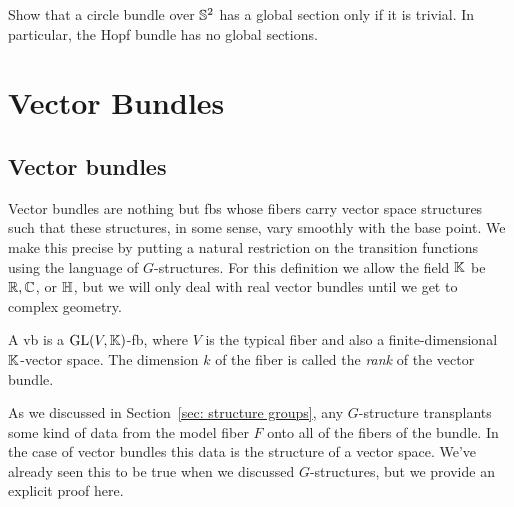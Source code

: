 \begin{xca}
    Show that a circle bundle over $\mathbb{S}^2$ has a global section only if it is trivial. In particular, the Hopf bundle has no global sections.
\end{xca}

\newpage
\section{Vector Bundles}


\subsection{Vector bundles}

Vector bundles are nothing but \glspl{fb} whose fibers carry vector space structures such that these structures, in some sense, vary smoothly with the base point. We make this precise by putting a natural restriction on the transition functions using the language of $G$-structures. For this definition we allow the field $\mathbb{K}$ be $\mathbb{R},\mathbb{C}$, or $\mathbb{H}$, but we will only deal with real vector bundles until we get to complex geometry.

\begin{defn}
    A \gls{vb} is a $\operatorname{GL}(V,\mathbb{K})$-\gls{fb}, where $V$ is the typical fiber and also a finite-dimensional $\mathbb{K}$-vector space. The dimension $k$ of the fiber is called the \emph{rank} of the vector bundle.
\end{defn}

As we discussed in Section~\ref{sec: structure groups}, any $G$-structure transplants some kind of data from the model fiber $F$ onto all of the fibers of the bundle. In the case of vector bundles this data is the structure of a vector space. We've already seen this to be true when we discussed $G$-structures, but we provide an explicit proof here.

